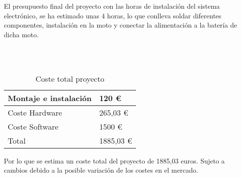 	El presupuesto final del proyecto con las horas de instalaci\'on del sistema electr\'onico, se ha estimado unas 4 horas, lo que conlleva soldar diferentes componentes, instalaci\'on en la moto y conectar la alimentaci\'on a la bater\'ia de dicha moto.
	
	\
	\\
	\	
	
	\begin{table}[H]
		\centering
		\begin{tabular}{p{7cm} p{4cm}}
			\hline
			Montaje e instalaci\'on & 120 \euro \\
			\hline
			Coste Hardware & 265,03 \euro \\
			\hline
			Coste Software & 1500 \euro \\
			\hline \hline
			Total & 1885,03 \euro \\
			\hline
		\end{tabular}
		\caption{Coste total proyecto}
		\label{tabla:LibreriasMota}
	\end{table}
	
	Por lo que se estima un coste total del proyecto de 1885,03 euros. Sujeto a cambios debido a la posible variaci\'on de los costes en el mercado.
	
	\newpage
	$\ $